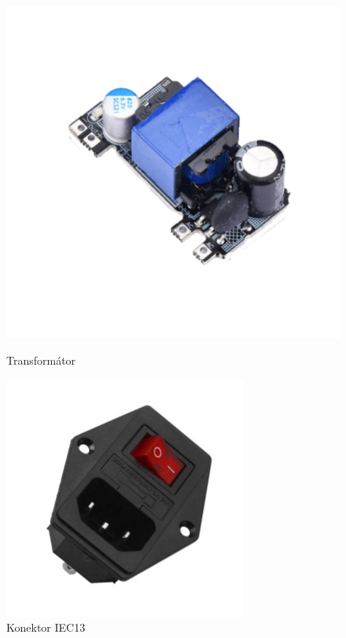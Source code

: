 \documentclass{article}
\begin{document}
\begin{figure}[!tbp]
  \centering
  \begin{minipage}[b]{0.3\textwidth}
    \includegraphics[width=\textwidth]{images/trafo.png}
    \caption{Transformátor~\cite{obrazek_trafo}}
    \label{trafo}
  \end{minipage}
  \hfill
  \begin{minipage}[b]{0.3\textwidth}
    \includegraphics[width=\textwidth]{images/zasuvka.jpg}
    \caption{Konektor IEC13~\cite{obrazek_konektor}}
    \label{konektor}
  \end{minipage}
\end{figure}


\printbibliography[heading=bibintoc,title={Použitá literatura}]
\end{document}
